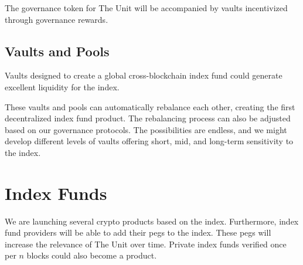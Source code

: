 \documentclass[12pt]{article}
\begin{document}
The governance token for The Unit will be accompanied by vaults incentivized through governance rewards.


\subsection{Vaults and Pools}

Vaults designed to create a global cross-blockchain index fund could generate excellent liquidity for the index.

These vaults and pools can automatically rebalance each other, creating the first decentralized index fund product. The rebalancing process can also be adjusted based on our governance protocols. The possibilities are endless, and we might develop different levels of vaults offering short, mid, and long-term sensitivity to the index. 

\section{Index Funds}

We are launching several crypto products based on the index. Furthermore, index fund providers will be able to add their pegs to the index. These pegs will increase the relevance of The Unit over time. Private index funds verified once per $n$ blocks could also become a product. 
\end{document}

